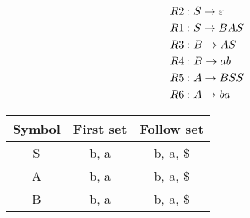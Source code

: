 \def\rSixLabel{R6}
\def\rSixDesc{A \to b a}

\begin{align*}
	\rOneLabel  :\;  & \rOneDesc   \\
	\rTwoLabel  :\;  & \rTwoDesc   \\
	\rThreeLabel :\; & \rThreeDesc \\
	\rFourLabel :\;  & \rFourDesc  \\
	\rFiveLabel :\;  & \rFiveDesc  \\
	\rSixLabel :\;   & \rSixDesc   \\
\end{align*}

\begin{center}
	\begin{tabular}{c c c}
		\toprule
		Symbol & First set & Follow set \\
		\midrule
		S      & b, a      & b, a, \$   \\
		A      & b, a      & b, a, \$   \\
		B      & b, a      & b, a, \$   \\
		\bottomrule
	\end{tabular}
\end{center}

